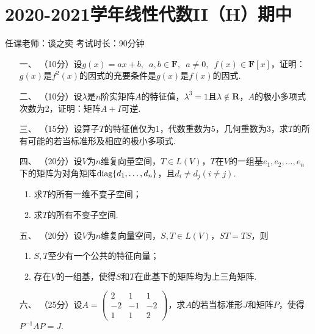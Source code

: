 \section*{2020-2021学年线性代数II（H）期中}


\begin{center}
    任课老师：谈之奕\hspace{4em} 考试时长：90分钟
\end{center}

\begin{enumerate}
	\item[一、]（10分）设$g(x)=ax+b,\enspace a,b\in\mathbf{F},\enspace a\neq 0,\enspace
    f(x)\in \mathbf{F}[x]$，证明：$g(x)$是$f^2(x)$的因式的充要条件是$g(x)$是$f(x)$的因式.
	\item[二、]（10分）设$\lambda$是$n$阶实矩阵$A$的特征值，$\lambda^3=1$且$\lambda\notin\mathbf{R}$，$A$的极小多项式次数为2，证明：矩阵$A+I$可逆.
	\item[三、]（15分）设算子$T$的特征值仅为1，代数重数为5，几何重数为3，求$T$的所有可能的若当标准形及相应的极小多项式.
	\item[四、]（20分）设$V$为$n$维复向量空间，$T\in L(V)$，$T$在$V$的一组基$e_1,e_2,\ldots,e_n$
	下的矩阵为对角矩阵$\textup{diag}\{d_1,\ldots,d_n\}$，且$d_i\neq d_j(i\neq j)$.
    \begin{enumerate}[label=(\arabic*)]
        \item 求$T$的所有一维不变子空间；

        \item 求$T$的所有不变子空间.
    \end{enumerate}
	\item[五、]（20分）设$V$为$n$维复向量空间，$S,T\in L(V)$，$ST=TS$，则
    \begin{enumerate}[label=(\arabic*)]
        \item $S,T$至少有一个公共的特征向量；

        \item 存在$V$的一组基，使得$S$和$T$在此基下的矩阵均为上三角矩阵.
    \end{enumerate}
	\item[六、]（25分）设$A=\begin{pmatrix}
		2 & 1 & 1 \\ -2 & -1 & -2 \\ 1 & 1 & 2
	\end{pmatrix}$，求$A$的若当标准形$J$和矩阵$P$，使得$P^{-1}AP=J$.
\end{enumerate}

\clearpage
